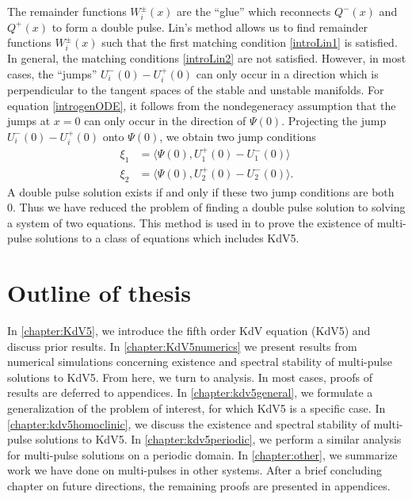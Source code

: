 \documentclass[thesis.tex]{subfiles}
\begin{document}
The remainder functions $W_i^\pm(x)$ are the ``glue'' which reconnects $Q^-(x)$ and $Q^+(x)$ to form a double pulse. Lin's method allows us to find remainder functions $W_i^\pm(x)$ such that the first matching condition \cref{introLin1} is satisfied. In general, the matching conditions \cref{introLin2} are not satisfied. However, in most cases, the ``jumps'' $U_i^-(0) - U_i^+(0)$ can only occur in a direction which is perpendicular to the tangent spaces of the stable and unstable manifolds. For equation \cref{introgenODE}, it follows from the nondegeneracy assumption that the jumps at $x = 0$ can only occur in the direction of $\Psi(0)$. Projecting the jump $U_i^-(0) - U_i^+(0)$ onto $\Psi(0)$, we obtain two jump conditions
\begin{equation}\label{introLinJump}
\begin{aligned}
\xi_1 &= \langle \Psi(0), U_1^+(0) - U_1^-(0) \rangle \\
\xi_2 &= \langle \Psi(0), U_2^+(0) - U_2^-(0) \rangle.
\end{aligned}
\end{equation} 
A double pulse solution exists if and only if these two jump conditions are both 0. Thus we have reduced the problem of finding a double pulse solution to solving a system of two equations. This method is used in \cite{SandstedeStrut} to prove the existence of multi-pulse solutions to a class of equations which includes KdV5. 

\section{Outline of thesis}

In \cref{chapter:KdV5}, we introduce the fifth order KdV equation (KdV5) and discuss prior results. In \cref{chapter:KdV5numerics} we present results from numerical simulations concerning existence and spectral stability of multi-pulse solutions to KdV5. From here, we turn to analysis. In most cases, proofs of results are deferred to appendices. In \cref{chapter:kdv5general}, we formulate a generalization of the problem of interest, for which KdV5 is a specific case. In \cref{chapter:kdv5homoclinic}, we discuss the existence and spectral stability of multi-pulse solutions to KdV5. In \cref{chapter:kdv5periodic}, we perform a similar analysis for multi-pulse solutions on a periodic domain. In \cref{chapter:other}, we summarize work we have done on multi-pulses in other systems. After a brief concluding chapter on future directions, the remaining proofs are presented in appendices.

\iffulldocument\else
	
	
\fi
\end{document}
